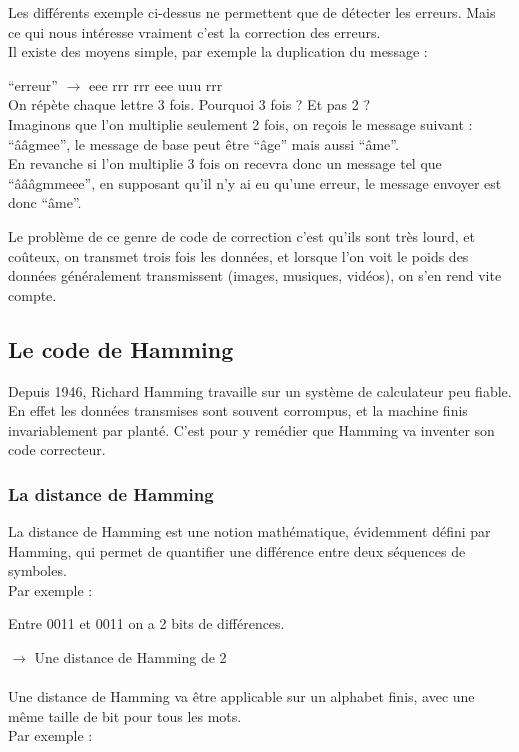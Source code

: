 \documentclass[12pt]{article}
\begin{document}
Les différents exemple ci-dessus ne permettent que de détecter les erreurs. Mais ce qui nous intéresse vraiment c'est la correction des erreurs.
\\ Il existe des moyens simple, par exemple la duplication du message :

\tab ``erreur'' $\rightarrow$ eee rrr rrr eee uuu rrr
\\ On répète chaque lettre 3 fois. Pourquoi 3 fois ? Et pas 2 ?
\\ Imaginons que l'on multiplie seulement 2 fois, on reçois le message suivant : ``ââgmee'', le message de base peut être ``âge'' mais aussi ``âme''.
\\ En revanche si l'on multiplie 3 fois on recevra donc un message tel que ``âââgmmeee'', en supposant qu'il n'y ai eu qu'une erreur, le message envoyer est donc ``âme''.

\tab Le problème de ce genre de code de correction c'est qu'ils sont très lourd, et coûteux, on transmet trois fois les données, et lorsque l'on voit le poids des données généralement transmissent (images, musiques, vidéos), on s'en rend vite compte.

\subsection{Le code de Hamming}
\label{sub:Le code de Hamming}

Depuis 1946, Richard Hamming travaille sur un système de calculateur peu fiable. En effet les données transmises sont souvent corrompus, et la machine finis invariablement par planté. C’est pour y remédier que Hamming va inventer son code correcteur.

\subsubsection{La distance de Hamming}
\label{subs:La distance de Hamming}

La distance de Hamming est une notion mathématique, évidemment défini par Hamming, qui permet de quantifier une différence entre deux séquences de symboles.
\\ Par exemple :

\tab Entre 0011 et 0011 on a 2 bits de différences.

\hspace{2cm} $\rightarrow$ Une distance de Hamming de 2
\\
\\ Une distance de Hamming va être applicable sur un alphabet finis, avec une même taille de bit pour tous les mots.
\\ Par exemple :
\end{document}
